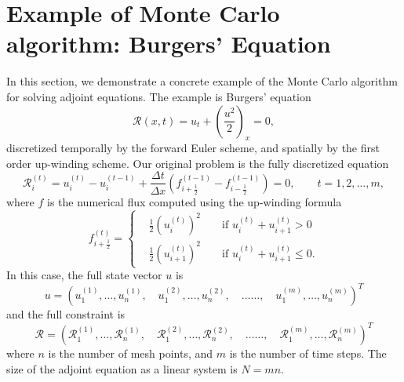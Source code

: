 \documentclass[a4paper,11pt]{article}
\theoremstyle{remark}
\theoremstyle{definition}
\begin{document}
\section{Example of Monte Carlo algorithm: Burgers' Equation}
    In this section, we demonstrate a concrete example of the Monte Carlo
    algorithm for solving adjoint equations.  The example is Burgers' equation
    \[ \mathcal{R}(x,t) = u_t + \left( \frac{u^2}{2} \right)_x = 0 , \]
    discretized temporally by the forward Euler scheme, and spatially by the
    first order up-winding scheme.  Our original problem is the fully
    discretized equation
    \begin{equation} \label{expG}
        \mathcal{R}_i^{(t)} = u_i^{(t)} - u_i^{(t-1)}
        + \frac{\Delta t}{\Delta x}\left( f_{i+\frac12}^{(t-1)}
        - f_{i-\frac12}^{(t-1)} \right) = 0,
        \qquad t = 1,2,\ldots,m,
    \end{equation}
    where $f$ is the numerical flux computed using the up-winding formula
    \[ f_{i+\frac12}^{(t)} =
        \left\{ \begin{aligned}
            & \frac12 \left( u_i^{(t)} \right)^2 &&
                \mbox{ if } u_i^{(t)} + u_{i+1}^{(t)} > 0 \\
            & \frac12 \left( u_{i+1}^{(t)} \right)^2 &&
                \mbox{ if } u_i^{(t)} + u_{i+1}^{(t)} \le 0.
    \end{aligned} \right. \]
    In this case, the full state vector $u$ is
    \[ u = \left( u_1^{(1)}, \ldots, u_n^{(1)},\quad u_1^{(2)}, \ldots,
           u_n^{(2)}, \quad \ldots\ldots,\quad
           u_1^{(m)}, \ldots, u_n^{(m)} \right)^T
    \]
    and the full constraint is
    \[ \mathcal{R} = \left( \mathcal{R}_1^{(1)}, \ldots, 
                            \mathcal{R}_n^{(1)}, \quad
                            \mathcal{R}_1^{(2)}, \ldots,
                            \mathcal{R}_n^{(2)}, \quad \ldots\ldots,\quad
                            \mathcal{R}_1^{(m)}, \ldots,
                            \mathcal{R}_n^{(m)} \right)^T
    \]
    where $n$ is the number of mesh points, and $m$ is the number of
    time steps.  The size of the adjoint equation as a linear system is
    $N = m n$.
    
\end{document}
